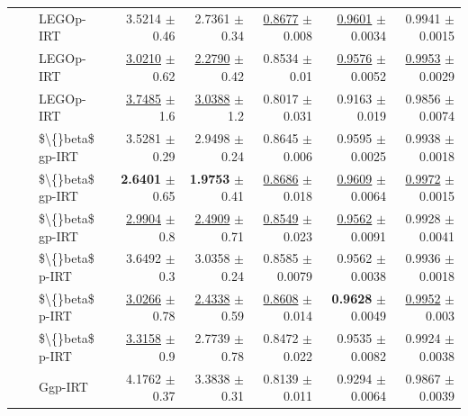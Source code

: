 \begin{longtable}{llp{}rrrrr}
 &  & LEGOp-IRT & 3.5214 {\scriptsize $\pm$ 0.46} & 2.7361 {\scriptsize $\pm$ 0.34} & \underline{0.8677} {\scriptsize $\pm$ 0.008} & \underline{0.9601} {\scriptsize $\pm$ 0.0034} & 0.9941 {\scriptsize $\pm$ 0.0015} \\
 &  & LEGOp-IRT & \underline{3.0210} {\scriptsize $\pm$ 0.62} & \underline{2.2790} {\scriptsize $\pm$ 0.42} & 0.8534 {\scriptsize $\pm$ 0.01} & \underline{0.9576} {\scriptsize $\pm$ 0.0052} & \underline{0.9953} {\scriptsize $\pm$ 0.0029} \\
 &  & LEGOp-IRT & \underline{3.7485} {\scriptsize $\pm$ 1.6} & \underline{3.0388} {\scriptsize $\pm$ 1.2} & 0.8017 {\scriptsize $\pm$ 0.031} & 0.9163 {\scriptsize $\pm$ 0.019} & 0.9856 {\scriptsize $\pm$ 0.0074} \\
 &  & \$\textbackslash\{\}beta\$ gp-IRT & 3.5281 {\scriptsize $\pm$ 0.29} & 2.9498 {\scriptsize $\pm$ 0.24} & 0.8645 {\scriptsize $\pm$ 0.006} & 0.9595 {\scriptsize $\pm$ 0.0025} & 0.9938 {\scriptsize $\pm$ 0.0018} \\
 &  & \$\textbackslash\{\}beta\$ gp-IRT & \textbf{2.6401} {\scriptsize $\pm$ 0.65} & \textbf{1.9753} {\scriptsize $\pm$ 0.41} & \underline{0.8686} {\scriptsize $\pm$ 0.018} & \underline{0.9609} {\scriptsize $\pm$ 0.0064} & \underline{0.9972} {\scriptsize $\pm$ 0.0015} \\
 &  & \$\textbackslash\{\}beta\$ gp-IRT & \underline{2.9904} {\scriptsize $\pm$ 0.8} & \underline{2.4909} {\scriptsize $\pm$ 0.71} & \underline{0.8549} {\scriptsize $\pm$ 0.023} & \underline{0.9562} {\scriptsize $\pm$ 0.0091} & 0.9928 {\scriptsize $\pm$ 0.0041} \\
 &  & \$\textbackslash\{\}beta\$ p-IRT & 3.6492 {\scriptsize $\pm$ 0.3} & 3.0358 {\scriptsize $\pm$ 0.24} & 0.8585 {\scriptsize $\pm$ 0.0079} & 0.9562 {\scriptsize $\pm$ 0.0038} & 0.9936 {\scriptsize $\pm$ 0.0018} \\
 &  & \$\textbackslash\{\}beta\$ p-IRT & \underline{3.0266} {\scriptsize $\pm$ 0.78} & \underline{2.4338} {\scriptsize $\pm$ 0.59} & \underline{0.8608} {\scriptsize $\pm$ 0.014} & \textbf{0.9628} {\scriptsize $\pm$ 0.0049} & \underline{0.9952} {\scriptsize $\pm$ 0.003} \\
 &  & \$\textbackslash\{\}beta\$ p-IRT & \underline{3.3158} {\scriptsize $\pm$ 0.9} & 2.7739 {\scriptsize $\pm$ 0.78} & 0.8472 {\scriptsize $\pm$ 0.022} & 0.9535 {\scriptsize $\pm$ 0.0082} & 0.9924 {\scriptsize $\pm$ 0.0038} \\
 &  & Ggp-IRT & 4.1762 {\scriptsize $\pm$ 0.37} & 3.3838 {\scriptsize $\pm$ 0.31} & 0.8139 {\scriptsize $\pm$ 0.011} & 0.9294 {\scriptsize $\pm$ 0.0064} & 0.9867 {\scriptsize $\pm$ 0.0039} \\

\end{longtable}
